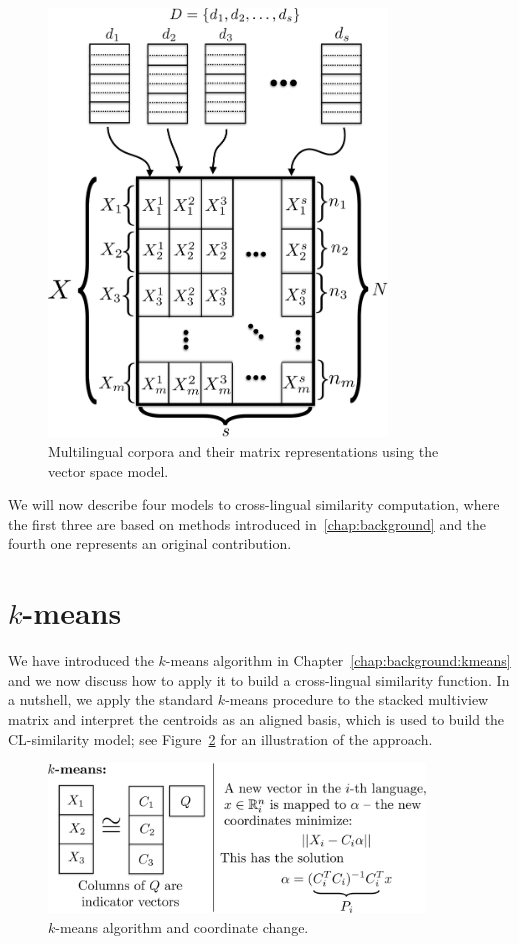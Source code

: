 \begin{figure}[tbp]
\centering
\includegraphics[width=9cm]{figures/stacked_matrices1-crop.pdf}
\caption{\label{fig:stacked_matrices} Multilingual corpora and their matrix representations using the vector space model.}
\end{figure}

We will now describe four models to cross-lingual similarity computation, where the first three are based on
methods introduced in~\ref{chap:background} and the fourth one represents an original contribution.
\section{$k$-means}\label{chap:crosslingual:kmeans}

We have introduced the $k$-means algorithm in Chapter~\ref{chap:background:kmeans} and we now discuss
how to apply it to build a cross-lingual similarity function. In a nutshell, we apply the standard
$k$-means procedure to the stacked multiview matrix and interpret the centroids as an aligned basis, which
is used to build the CL-similarity model; see Figure~\ref{fig:kmeans} for an illustration of the approach.

\begin{figure}[tbp]
\centering
\includegraphics[width=10cm]{figures/kmeans.pdf}
\caption{\label{fig:kmeans} $k$-means algorithm and coordinate change.}
\end{figure}

